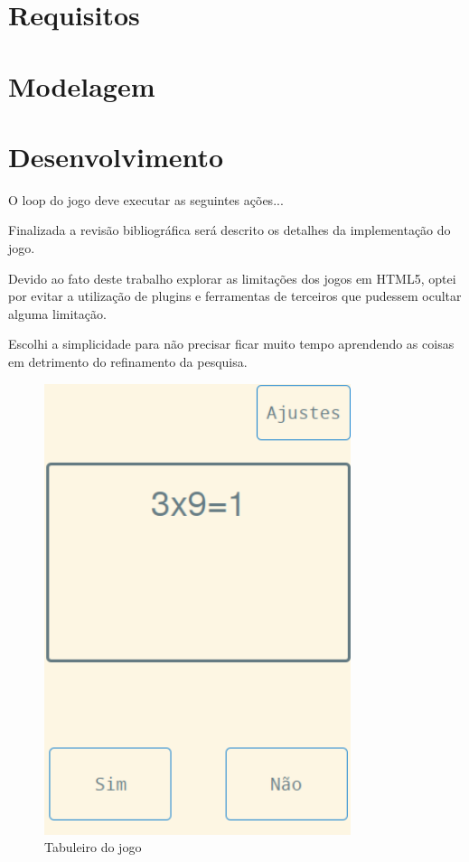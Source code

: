 \documentclass[
12pt,
a4paper,
portuges,
draft
]{report}
\begin{document}
\section{Requisitos}
\section{Modelagem}
\section{Desenvolvimento}

O loop do jogo deve executar as seguintes ações...

Finalizada a revisão bibliográfica será descrito os detalhes da implementação do jogo.

Devido ao fato deste trabalho explorar as limitações dos jogos em
HTML5, optei por evitar a utilização de plugins e ferramentas de
terceiros que pudessem ocultar alguma limitação.

Escolhi a simplicidade para não precisar ficar muito tempo aprendendo
as coisas em detrimento do refinamento da pesquisa.

\begin{figure}
    \centering
    \includegraphics[width=0.8\textwidth,natwidth=610,natheight=642]{board.png}
	\caption{Tabuleiro do jogo}
\end{figure}
\end{document}
